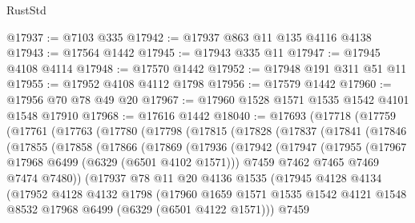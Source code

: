 \begin{lexlean}{RustStd}
\begin{coremodule}
{{@17937 := @7103 @335
@17942 := @17937 @863 @11 @135 @4116 @4138
@17943 := @17564 @1442
@17945 := @17943 @335 @11
@17947 := @17945 @4108 @4114
@17948 := @17570 @1442
@17952 := @17948 @191 @311 @51 @11
@17955 := @17952 @4108 @4112 @1798
@17956 := @17579 @1442
@17960 := @17956 @70 @78 @49 @20
@17967 := @17960 @1528 @1571 @1535 @1542 @4101 @1548 @17910
@17968 := @17616 @1442
@18040 := @17693
    (@17718
      (@17759
        (@17761
          (@17763
            (@17780
              (@17798
                (@17815
                  (@17828
                    (@17837
                      (@17841
                        (@17846
                          (@17855
                            (@17858
                              (@17866
                                (@17869
                                  (@17936
                                    (@17942
                                      (@17947
                                        (@17955
                                          (@17967 @17968 @6499 (@6329 (@6501 @4102 @1571)))
                                          @7459
                                          @7462
                                          @7465
                                          @7469
                                          @7474
                                          @7480))
                                      (@17937
                                        @78
                                        @11
                                        @20
                                        @4136
                                        @1535
                                        (@17945
                                          @4128
                                          @4134
                                          (@17952
                                            @4128
                                            @4132
                                            @1798
                                            (@17960
                                              @1659
                                              @1571
                                              @1535
                                              @1542
                                              @4121
                                              @1548
                                              @8532
                                              @17968
                                              @6499
                                              (@6329 (@6501 @4122 @1571)))
                                            @7459
}}
\end{coremodule}
\end{lexlean}
